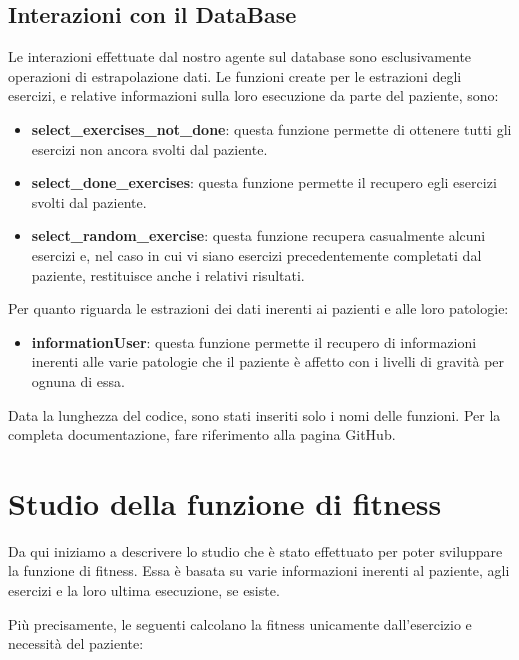\documentclass{article}
\begin{document}
    \subsection{Interazioni con il DataBase}
    Le interazioni effettuate dal nostro agente sul database sono esclusivamente operazioni di estrapolazione dati. Le funzioni create per le estrazioni degli esercizi, e relative informazioni sulla loro esecuzione da parte del paziente, sono:
    \begin{itemize}
        \item\textbf{select\_exercises\_not\_done}: questa funzione permette di ottenere tutti gli esercizi non ancora svolti dal paziente.

        \item\textbf{select\_done\_exercises}: questa funzione permette il recupero egli esercizi svolti dal paziente.

        \item\textbf{select\_random\_exercise}: questa funzione recupera casualmente alcuni esercizi e, nel caso in cui vi siano esercizi precedentemente completati dal paziente, restituisce anche i relativi risultati.

    \end{itemize}
    Per quanto riguarda le estrazioni dei dati inerenti ai pazienti e alle loro patologie:
    \begin{itemize}
        \item\textbf{informationUser}: questa funzione permette il recupero di informazioni inerenti alle varie patologie che il paziente è affetto con i livelli di gravità per ognuna di essa.

    \end{itemize}

    Data la lunghezza del codice, sono stati inseriti solo i nomi delle funzioni. Per la completa documentazione, fare riferimento alla pagina GitHub.

\pagebreak

    \section{Studio della funzione di fitness}
    Da qui iniziamo a descrivere lo studio che è stato effettuato per poter sviluppare la funzione di fitness. Essa è basata su varie informazioni inerenti al paziente, agli esercizi e la loro ultima esecuzione, se esiste.

    Più precisamente, le seguenti calcolano la fitness unicamente dall'esercizio e necessità del paziente:
\end{document}
